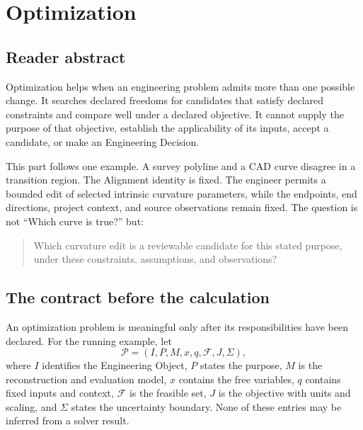 \chapter*{Optimization}
{}

\section*{Reader abstract}

Optimization helps when an engineering problem admits more than one possible
change. It searches declared freedoms for candidates that satisfy declared
constraints and compare well under a declared objective. It cannot supply the
purpose of that objective, establish the applicability of its inputs, accept a
candidate, or make an Engineering Decision.

This part follows one example. A survey polyline and a CAD curve disagree in a
transition region. The Alignment identity is fixed. The engineer permits a
bounded edit of selected intrinsic curvature parameters, while the endpoints,
end directions, project context, and source observations remain fixed. The
question is not ``Which curve is true?'' but:
\begin{quote}
Which curvature edit is a reviewable candidate for this stated purpose, under
these constraints, assumptions, and observations?
\end{quote}

\section*{The contract before the calculation}

An optimization problem is meaningful only after its responsibilities have
been declared. For the running example, let
\[
\mathcal P=(I,P,M,x,q,\mathcal F,J,\Sigma),
\]
where \(I\) identifies the Engineering Object, \(P\) states the purpose,
\(M\) is the reconstruction and evaluation model, \(x\) contains the free
variables, \(q\) contains fixed inputs and context, \(\mathcal F\) is the
feasible set, \(J\) is the objective with units and scaling, and \(\Sigma\)
states the uncertainty boundary. None of these entries may be inferred from a
solver result.

